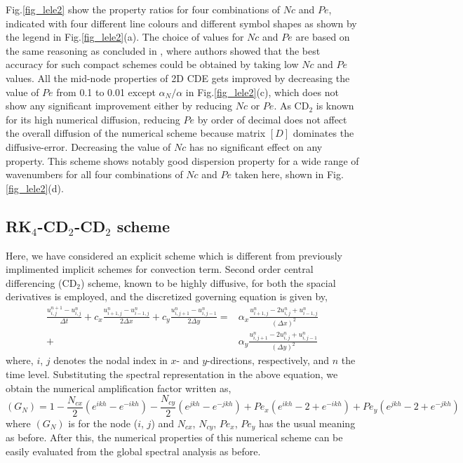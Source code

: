 \documentclass[showpacs,preprintnumbers,amsmath,amssymb]{revtex4-1} %
\begin{document}
Fig.\ref{fig_lele2} show the property ratios for four combinations of $Nc$ and $Pe$, indicated with four different line colours and different symbol shapes as shown by the legend in Fig.\ref{fig_lele2}(a). The choice of values for $Nc$ and $Pe$ are based on the same reasoning as concluded in \cite{SUMAN_et_al}, where authors showed that the best accuracy for such compact schemes could be obtained by taking low $Nc$ and $Pe$ values. All the mid-node properties of 2D CDE gets improved by decreasing the value of $Pe$ from 0.1 to 0.01 except $\alpha_N/\alpha$ in Fig.\ref{fig_lele2}(c), which does not show any significant improvement either by reducing $Nc$ or $Pe$. As CD$_2$ is known for its high numerical diffusion, reducing $Pe$ by order of decimal does not affect the overall diffusion of the numerical scheme because matrix $[D]$ dominates the diffusive-error. Decreasing the value of $Nc$ has no significant effect on any property. This scheme shows notably good dispersion property for a wide range of wavenumbers for all four combinations of $Nc$ and $Pe$ taken here, shown in Fig.\ref{fig_lele2}(d).

\subsection{RK$_4$-CD$_2$-CD$_2$ scheme}

Here, we have considered an explicit scheme which is different from previously implimented implicit schemes for convection term. Second order central differencing (CD$_2$) scheme, known to be highly diffusive, for both the spacial derivatives is employed, and the discretized governing equation is given by,
\begin{equation}
\begin{aligned}
\frac{u_{i,j}^{n+1}-u_{i,j}^{n}}{\Delta t}+c_x \frac{u_{i+1,j}^{n}-u_{i-1,j}^{n}}{2\Delta x}+c_y \frac{u_{i,j+1}^{n}-u_{i,j-1}^{n}}{2\Delta y}=&\alpha_x \frac{u_{i+1,j}^{n}-2u_{i,j}^{n}+u_{i-1,j}^{n}}{(\Delta x)^2}\\
+&\alpha_y \frac{u_{i,j+1}^{n}-2u_{i,j}^{n}+u_{i,j-1}^{n}}{(\Delta y)^2}
\end{aligned}
\end{equation}
where, $i$, $j$ denotes the nodal index in $x$- and $y$-directions, respectively, and $n$ the time level. Substituting the spectral representation in the above equation, we obtain the numerical amplification factor written as,
\begin{equation}
(G_N)=1-\frac{N_{cx}}{2}(e^{ikh}-e^{-ikh})-\frac{N_{cy}}{2}(e^{jkh}-e^{-jkh})+Pe_x(e^{ikh}-2+e^{-ikh})+Pe_y(e^{jkh}-2+e^{-jkh})
\end{equation}
where $(G_N)$ is for the node ($i$, $j$) and $N_{cx}$, $N_{cy}$, $Pe_{x}$, $Pe_{y}$ has the usual meaning as before. After this, the numerical properties of this numerical scheme can be easily evaluated from the global spectral analysis as before.
\end{document}
